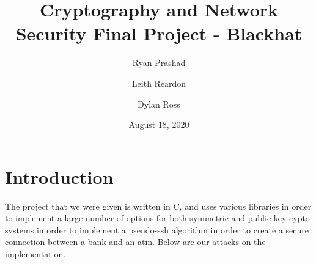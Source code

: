 \documentclass{article}
\title{Cryptography and Network Security Final Project - Blackhat}
\date{August 18, 2020}
\author{Ryan Prashad\and Leith Reardon\and Dylan Ross}
\begin{document}
	\maketitle

	\tableofcontents

	\section*{Introduction}
		The project that we were given is written in C, and uses various libraries in order to implement a large number of options for both symmetric and public key cypto systems in order
		to implement a pseudo-ssh algorithm in order to create a secure connection between a bank and an atm. Below are our attacks on the implementation.

	

	

	

	
\end{document}
